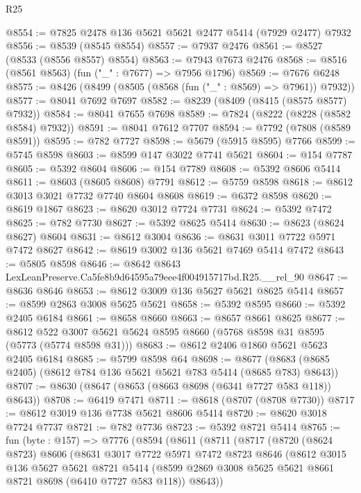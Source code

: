 \begin{lexlean}{R25}
\begin{coremodule}
@8554 := @7825 @2478 @136 @5621 @5621 @2477 @5414 (@7929 @2477) @7932
@8556 := @8539 (@8545 @8554)
@8557 := @7937 @2476
@8561 := @8527 (@8533 (@8556 @8557) @8554)
@8563 := @7943 @7673 @2476
@8568 := @8516 (@8561 @8563) (fun ("_" : @7677) => @7956 @1796)
@8569 := @7676 @6248
@8575 := @8426 (@8499 (@8505 (@8568 (fun ("_" : @8569) => @7961)) @7932))
@8577 := @8041 @7692 @7697
@8582 := @8239 (@8409 (@8415 (@8575 @8577) @7932))
@8584 := @8041 @7655 @7698
@8589 := @7824 (@8222 (@8228 (@8582 @8584) @7932))
@8591 := @8041 @7612 @7707
@8594 := @7792 (@7808 (@8589 @8591))
@8595 := @782 @7727
@8598 := @5679 (@5915 @8595) @7766
@8599 := @5745 @8598
@8603 := @8599 @147 @3022 @7741 @5621
@8604 := @154 @7787
@8605 := @5392 @8604
@8606 := @154 @7789
@8608 := @5392 @8606 @5414
@8611 := @8603 (@8605 @8608) @7791
@8612 := @5759 @8598
@8618 := @8612 @3013 @3021 @7732 @7740 @8604 @8608
@8619 := @6372 @8598
@8620 := @8619 @1867
@8623 := @8620 @3012 @7724 @7731
@8624 := @5392 @7472
@8625 := @782 @7730
@8627 := @5392 @8625 @5414
@8630 := @8623 (@8624 @8627) @8604
@8631 := @8612 @3004
@8636 := @8631 @3011 @7722 @5971 @7472 @8627
@8642 := @8619 @3002 @136 @5621 @7469 @5414 @7472
@8643 := @5805 @8598
@8646 := @8642 @8643 LexLeanPreserve.Ca5fe8b9d64595a79eee4f004915717bd.R25.__rel_90
@8647 := @8636 @8646
@8653 := @8612 @3009 @136 @5627 @5621 @8625 @5414
@8657 := @8599 @2863 @3008 @5625 @5621
@8658 := @5392 @8595
@8660 := @5392 @2405 @6184
@8661 := @8658 @8660
@8663 := @8657 @8661 @8625
@8677 := @8612 @522 @3007 @5621 @5624 @8595 @8660 (@5768 @8598 @31 @8595 (@5773 (@5774 @8598 @31)))
@8683 := @8612 @2406 @1860 @5621 @5623 @2405 @6184
@8685 := @5799 @8598 @64
@8698 := @8677 (@8683 (@8685 @2405) (@8612 @784 @136 @5621 @5621 @783 @5414 (@8685 @783) @8643))
@8707 := @8630 (@8647 (@8653 (@8663 @8698 (@6341 @7727 @583 @118)) @8643))
@8708 := @6419 @7471
@8711 := @8618 (@8707 (@8708 @7730))
@8717 := @8612 @3019 @136 @7738 @5621 @8606 @5414
@8720 := @8620 @3018 @7724 @7737
@8721 := @782 @7736
@8723 := @5392 @8721 @5414
@8765 := fun (byte : @157) =>
  @7776
    (@8594
      (@8611
        (@8711
          (@8717
            (@8720
              (@8624 @8723)
              @8606
              (@8631
                @3017
                @7722
                @5971
                @7472
                @8723
                @8646
                (@8612
                  @3015
                  @136
                  @5627
                  @5621
                  @8721
                  @5414
                  (@8599 @2869 @3008 @5625 @5621 @8661 @8721 @8698 (@6410 @7727 @583 @118))
                  @8643))

\end{coremodule}
\end{lexlean}
